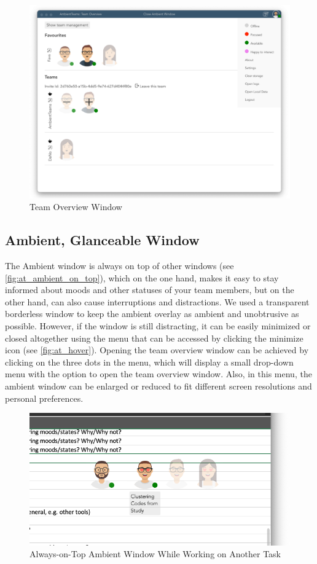 \begin{figure}[h]
    \centering
    \includegraphics[width=.8\linewidth]{./images/AT_overview.png}
    \caption{Team Overview Window }
    \label{fig:at_overview}
\end{figure}

\subsection{Ambient, Glanceable Window}
The Ambient window is always on top of other windows (see \autoref{fig:at_ambient_on_top}), which on the one hand, makes it easy to stay informed about moods and other statuses of your team members, but on the other hand, can also cause interruptions and distractions. We used a transparent borderless window to keep the ambient overlay as ambient and unobtrusive as possible. However, if the window is still distracting, it can be easily minimized or closed altogether using the menu that can be accessed by clicking the minimize icon (see \autoref{fig:at_hover}). Opening the team overview window can be achieved by clicking on the three dots in the menu, which will display a small drop-down menu with the option to open the team overview window. Also, in this menu, the ambient window can be enlarged or reduced to fit different screen resolutions and personal preferences.

\begin{figure}[h]
    \centering
    \includegraphics[width=.8\linewidth]{./images/AT_ambient_on_top.png}
    \caption{Always-on-Top Ambient Window While Working on Another Task}
    \label{fig:at_ambient_on_top}
\end{figure}


